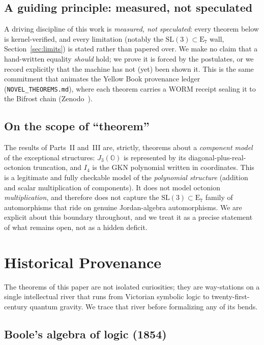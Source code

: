 \documentclass[11pt]{article}
\theoremstyle{definition}
\newcommand{\OO}{\mathbb{O}}
\newcommand{\Jthree}{J_3(\OO)}
\newcommand{\Iq}{I_4}
\newcommand{\Eseven}{\mathrm{E}_7}
\begin{document}
\subsection{A guiding principle: measured, not speculated}

A driving discipline of this work is \emph{measured, not speculated}: every
theorem below is kernel-verified, and every limitation (notably the
$\mathrm{SL}(3)\subset\mathrm{E}_7$ wall, Section~\ref{sec:limits}) is stated
rather than papered over. We make no claim that a hand-written equality
\emph{should} hold; we prove it is forced by the postulates, or we record
explicitly that the machine has not (yet) been shown it. This is the same
commitment that animates the Yellow Book provenance ledger
(\texttt{NOVEL\_THEOREMS.md}), where each theorem carries a WORM receipt
sealing it to the Bifrost chain (Zenodo~\cite{zenodo}).

\subsection{On the scope of ``theorem''}

The results of Parts~II and~III are, strictly, theorems about a \emph{component
model} of the exceptional structures: $\Jthree$ is represented by its
diagonal-plus-real-octonion truncation, and $\Iq$ is the GKN polynomial written
in coordinates. This is a legitimate and fully checkable model of the
\emph{polynomial structure} (addition and scalar multiplication of components).
It does not model octonion \emph{multiplication}, and therefore does not capture
the $\mathrm{SL}(3)\subset\Eseven$ family of automorphisms that ride on genuine
Jordan-algebra automorphisms. We are explicit about this boundary throughout,
and we treat it as a precise statement of what remains open, not as a hidden
deficit.

\section{Historical Provenance}
\label{sec:history}

The theorems of this paper are not isolated curiosities; they are way-stations
on a single intellectual river that runs from Victorian symbolic logic to
twenty-first-century quantum gravity. We trace that river before formalizing
any of its bends.

\subsection{Boole's algebra of logic (1854)}
\label{sec:hist-boole}
\end{document}
